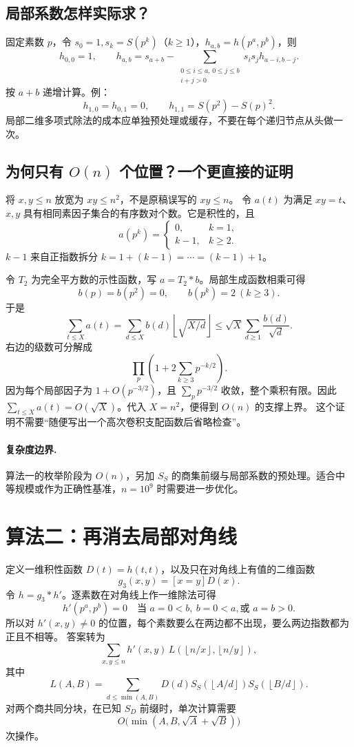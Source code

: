 \documentclass[UTF8,a4paper,11pt,oneside,openany,fontset=fandol]{ctexbook}
\theoremstyle{definition}
\newcommand{\floor}[1]{\left\lfloor #1\right\rfloor}
\begin{document}
\subsection{局部系数怎样实际求？}
固定素数 $p$，令 $s_0=1,s_k=S(p^k)$（$k\ge1$），$h_{a,b}=h(p^a,p^b)$，则
\[
 h_{0,0}=1,\qquad
 h_{a,b}=s_{a+b}-\sum_{\substack{0\le i\le a,\,0\le j\le b\\i+j>0}}
 s_i s_j h_{a-i,b-j}.
\]
按 $a+b$ 递增计算。例：
\[
 h_{1,0}=h_{0,1}=0,\qquad h_{1,1}=S(p^2)-S(p)^2.
\]
局部二维多项式除法的成本应单独预处理或缓存，不要在每个递归节点从头做一次。

\subsection{为何只有 \texorpdfstring{$O(n)$}{O(n)} 个位置？一个更直接的证明}
将 $x,y\le n$ 放宽为 $xy\le n^2$，不是原稿误写的 $xy\le n$。
令 $a(t)$ 为满足 $xy=t$、$x,y$ 具有相同素因子集合的有序数对个数。它是积性的，且
\[
 a(p^k)=\begin{cases}0,&k=1,\\k-1,&k\ge2.\end{cases}
\]
$k-1$ 来自正指数拆分 $k=1+(k-1)=\cdots=(k-1)+1$。

令 $T_2$ 为完全平方数的示性函数，写 $a=T_2*b$。局部生成函数相乘可得
\[
 b(p)=b(p^2)=0,\qquad b(p^k)=2\ (k\ge3).
\]
于是
\[
\sum_{t\le X}a(t)=\sum_{d\le X}b(d)\floor{\sqrt{X/d}}
\le\sqrt X\sum_{d\ge1}\frac{b(d)}{\sqrt d}.
\]
右边的级数可分解成
\[
 \prod_p\left(1+2\sum_{k\ge3}p^{-k/2}\right).
\]
因为每个局部因子为 $1+O(p^{-3/2})$，且 $\sum_p p^{-3/2}$ 收敛，整个乘积有限。因此 $\sum_{t\le X}a(t)=O(\sqrt X)$。代入 $X=n^2$，便得到 $O(n)$ 的支撑上界。
这个证明不需要“随便写出一个高次卷积支配函数后省略检查”。

\paragraph{复杂度边界.} 算法一的枚举阶段为 $O(n)$，另加 $S_S$ 的商集前缀与局部系数的预处理。适合中等规模或作为正确性基准，$n=10^9$ 时需要进一步优化。


\section{算法二：再消去局部对角线}
定义一维积性函数 $D(t)=h(t,t)$，以及只在对角线上有值的二维函数
\[
 g_3(x,y)=[x=y]D(x).
\]
令 $h=g_3*h'$。逐素数在对角线上作一维除法可得
\[
 h'(p^a,p^b)=0\quad\text{当 }a=0<b,\ b=0<a,\text{或 }a=b>0.
\]
所以对 $h'(x,y)\ne0$ 的位置，每个素数要么在两边都不出现，要么两边指数都为正且不相等。
答案转为
\[
 \sum_{x,y\le n}h'(x,y)\,L(\floor{n/x},\floor{n/y}),
\]
其中
\[
 L(A,B)=\sum_{d\le\min(A,B)}D(d)
 S_S(\floor{A/d})S_S(\floor{B/d}).
\]
对两个商共同分块，在已知 $S_D$ 前缀时，单次计算需要
\[
 O\bigl(\min(A,B,\sqrt A+\sqrt B)\bigr)
\]
次操作。
\end{document}

